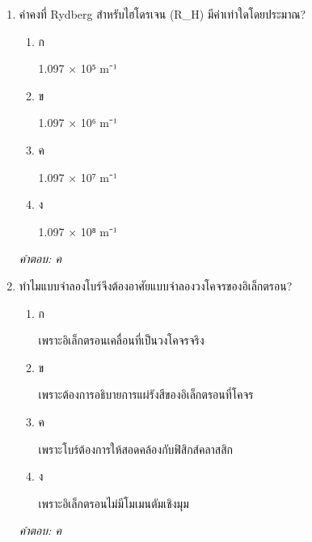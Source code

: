 \documentclass[12pt]{article}
\begin{document}
\begin{enumerate}[label=\arabic*., itemsep=0.5\baselineskip, topsep=0.5\baselineskip, leftmargin=*]
\item ค่าคงที่ Rydberg สำหรับไฮโดรเจน (R\_H) มีค่าเท่าใดโดยประมาณ?
\begin{enumerate}[label=\alph*)., itemsep=0.3\baselineskip, topsep=0.3\baselineskip]
\item ก\ 
\begin{minipage}[t]{0.9\linewidth}
\raggedright 1.097 × 10⁵ m⁻¹
\end{minipage}
\item ข\ 
\begin{minipage}[t]{0.9\linewidth}
\raggedright 1.097 × 10⁶ m⁻¹
\end{minipage}
\item ค\ 
\begin{minipage}[t]{0.9\linewidth}
\raggedright 1.097 × 10⁷ m⁻¹
\end{minipage}
\item ง\ 
\begin{minipage}[t]{0.9\linewidth}
\raggedright 1.097 × 10⁸ m⁻¹
\end{minipage}
\end{enumerate}
\vspace{-0.3\baselineskip}
\begin{small}
\textit{คำตอบ: ค}
\end{small}

\item ทำไมแบบจำลองโบร์จึงต้องอาศัยแบบจำลองวงโคจรของอิเล็กตรอน?
\begin{enumerate}[label=\alph*)., itemsep=0.3\baselineskip, topsep=0.3\baselineskip]
\item ก\ 
\begin{minipage}[t]{0.9\linewidth}
\raggedright เพราะอิเล็กตรอนเคลื่อนที่เป็นวงโคจรจริง
\end{minipage}
\item ข\ 
\begin{minipage}[t]{0.9\linewidth}
\raggedright เพราะต้องการอธิบายการแผ่รังสีของอิเล็กตรอนที่โคจร
\end{minipage}
\item ค\ 
\begin{minipage}[t]{0.9\linewidth}
\raggedright เพราะโบร์ต้องการให้สอดคล้องกับฟิสิกส์คลาสสิก
\end{minipage}
\item ง\ 
\begin{minipage}[t]{0.9\linewidth}
\raggedright เพราะอิเล็กตรอนไม่มีโมเมนตัมเชิงมุม
\end{minipage}
\end{enumerate}
\vspace{-0.3\baselineskip}
\begin{small}
\textit{คำตอบ: ค}
\end{small}


\end{enumerate}
\end{document}
